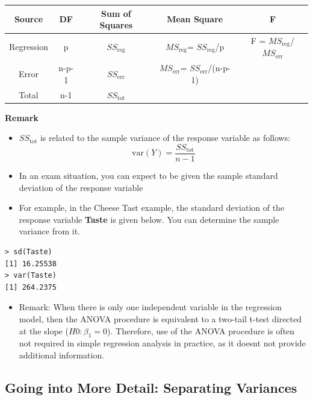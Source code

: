 \documentclass[a4paper,12pt]{article}
\begin{document}
{
	\large
\begin{tabular}{|c|c|c|c|c|}
	\hline \rule[-2ex]{0pt}{5.5ex} Source & DF & Sum of Squares  & Mean Square  & F \\ 
	\hline \rule[-2ex]{0pt}{5.5ex} Regression & p & $SS_\textrm{reg}$  & $MS_\textrm{reg}$= $SS_\textrm{reg}$/p & F = $MS_\textrm{reg}$/$MS_\textrm{err}$  \\ 
	\hline \rule[-2ex]{0pt}{5.5ex} Error & n-p-1 & $SS_\textrm{err}$ & $MS_\textrm{err}$= $SS_\textrm{err}$/(n-p-1) &  \\ 
	\hline \rule[-2ex]{0pt}{5.5ex} Total & n-1 & $SS_\textrm{tot}$  &  &  \\ 
	\hline 
\end{tabular} 
}
\noindent \textbf{Remark }
\begin{itemize}
	\item $SS_\textrm{tot}$ is related to the sample variance of the response variable as follows:
	\[ \textrm{var}(Y) =  \frac{SS_\textrm{tot} }{n-1}\]
	\item In an exam situation, you can expect to be given the sample standard deviation of the response variable
	\item For example, in the Cheese Tast example, the standard deviation of the response variable \textbf{Taste} is given below. You can determine the sample variance from it.
\end{itemize}

\begin{framed}
\begin{verbatim}
> sd(Taste)
[1] 16.25538
> var(Taste)
[1] 264.2375
\end{verbatim}
\end{framed}
\begin{itemize}
\item Remark: When there is only one independent variable in the regression model, then the ANOVA procedure is
equivalent to a two-tail t-test directed at the slope ($H0: \beta_1= 0$). Therefore, use of the ANOVA
procedure is often not required in simple regression analysis in practice, as it doesnt not provide additional information.
\end{itemize}
\newpage
\subsection{Going into More Detail: Separating Variances}
\end{document}
